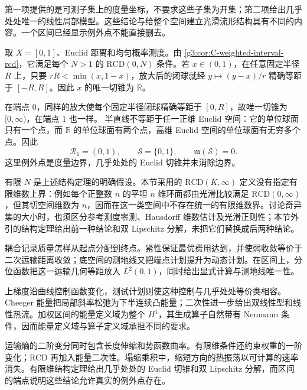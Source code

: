 \ProseParagraphBreak
第一项提供的是可测子集上的度量坐标，不要求这些子集为开集；第二项给出几乎处处唯一的线性局部模型。这些结论与给整个空间建立光滑流形结构具有不同的内容。一个区间已经显示例外点不能直接删去。

\begin{example}\label{g3:exm:C-interval-endpoint-tangents}
	取 \(X=[0,1]\)、Euclid 距离和均匀概率测度。由
	\cref{g3:cor:C-weighted-interval-rcd}，它满足每个 \(N>1\) 的
	\(\mathrm{RCD}(0,N)\) 条件。若 \(x\in(0,1)\)，在任意固定半径
	\(R\) 上，只要 \(rR<\min(x,1-x)\)，放大后的闭球就经
	\(y\mapsto(y-x)/r\) 精确等距于 \([-R,R]\)。因此 \(x\) 的唯一切锥为
	\(\mathbb R\)。

	在端点 \(0\)，同样的放大使每个固定半径闭球精确等距于
	\([0,R]\)，故唯一切锥为 \([0,\infty)\)，在端点 \(1\) 也一样。
	半直线不等距于任一正维 Euclid 空间：它的单位球面只有一个点，而
	\(\mathbb R\) 的单位球面有两个点，高维 Euclid 空间的单位球面有无穷多个点。因此
	\[
		\mathcal R_1=(0,1),\qquad
		\mathcal S=\{0,1\},\qquad \mathfrak m(\mathcal S)=0.
	\]
	这里例外点是度量边界，几乎处处的 Euclid 切锥并未消除边界。
\end{example}

有限 \(N\) 是上述结构定理的明确假设。本节采用的
\(\mathrm{RCD}(K,\infty)\) 定义没有指定有限维数上界：例如每个正整数
\(n\) 的平坦 \(n\) 维环面都由光滑比较满足
\(\mathrm{RCD}(0,\infty)\)，但其切空间维数为 \(n\)，因而在这一类空间中不存在统一的有限维数界。讨论奇异集的大小时，也须区分参考测度零测、Hausdorff 维数估计及光滑正则性；本节外引的结构定理给出前一种结论和双 Lipschitz 分解，未把它们替换成后两种结论。

\begin{chaptersummary}
	耦合记录质量怎样从起点分配到终点。紧性保证最优费用达到，并使弱收敛等价于二次运输距离收敛；底空间的测地线又把端点计划提升为动态计划。在区间上，分位函数把这一运输几何等距放入 \(L^2(0,1)\)，同时给出显式计算与测地线唯一性。

	\ProseParagraphBreak
	上梯度沿曲线控制函数变化，测试计划则使这种控制与几乎处处等价类相容。Cheeger 能量把局部斜率松弛为下半连续凸能量；二次性进一步给出双线性型和线性热流。加权区间的能量定义域为整个 \(H^1\)，其生成算子自然带有 Neumann 条件，因而能量定义域与算子定义域承担不同的要求。

	\ProseParagraphBreak
	运输熵的二阶变分同时包含长度伸缩和势函数曲率。有限维条件还约束权重的一阶变化；RCD 再加入能量二次性。塌缩乘积中，缩短方向的热振荡以可计算的速率消失。有限维结构定理给出几乎处处的 Euclid 切锥和双 Lipschitz 分解，而区间的端点说明这些结论允许真实的例外点存在。
\end{chaptersummary}

